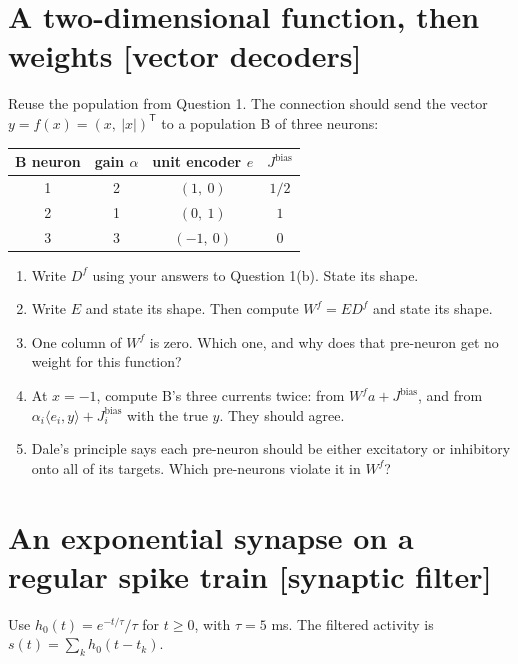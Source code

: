 \documentclass[11pt,letterpaper]{article}
\newcommand{\Jb}{J^{\mathrm{bias}}}
\newcommand{\T}{\mathsf T}
\begin{document}
\section{A two-dimensional function, then weights \hfill [vector decoders]}

Reuse the population from Question 1. The connection should send the vector $y = f(x) = (x,\ |x|)^\T$ to a population B of three neurons:

\begin{center}
\begin{tabular}{cccc}
B neuron & gain $\alpha$ & unit encoder $e$ & $\Jb$ \\ \hline
1 & 2 & $(1,\ 0)$ & $1/2$ \\
2 & 1 & $(0,\ 1)$ & $1$ \\
3 & 3 & $(-1,\ 0)$ & $0$
\end{tabular}
\end{center}

\begin{enumerate}
\item Write $D^f$ using your answers to Question 1(b). State its shape.
\item Write $E$ and state its shape. Then compute $W^f = E D^f$ and state its shape.
\item One column of $W^f$ is zero. Which one, and why does that pre-neuron get no weight for this function?
\item At $x = -1$, compute B's three currents twice: from $W^f a + \Jb$, and from $\alpha_i \langle e_i, y \rangle + \Jb_i$ with the true $y$. They should agree.
\item Dale's principle says each pre-neuron should be either excitatory or inhibitory onto all of its targets. Which pre-neurons violate it in $W^f$?
\end{enumerate}

\section{An exponential synapse on a regular spike train \hfill [synaptic filter]}

Use $h_0(t) = e^{-t/\tau}/\tau$ for $t \ge 0$, with $\tau = 5$ ms. The filtered activity is $s(t) = \sum_k h_0(t - t_k)$.
\end{document}
